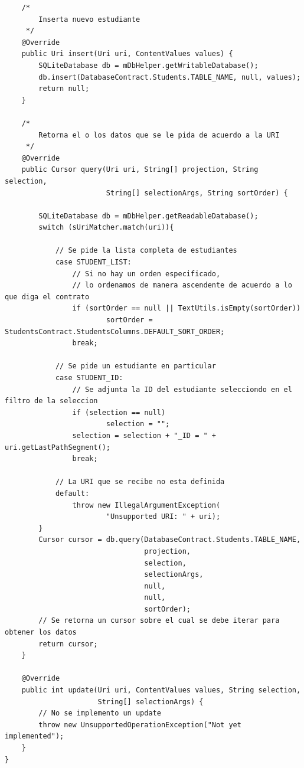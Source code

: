 \documentclass[10pt]{extarticle}
\begin{document}
\begin{lstlisting}
    /*
        Inserta nuevo estudiante
     */
    @Override
    public Uri insert(Uri uri, ContentValues values) {
        SQLiteDatabase db = mDbHelper.getWritableDatabase();
        db.insert(DatabaseContract.Students.TABLE_NAME, null, values);
        return null;
    }

    /*
        Retorna el o los datos que se le pida de acuerdo a la URI
     */
    @Override
    public Cursor query(Uri uri, String[] projection, String selection,
                        String[] selectionArgs, String sortOrder) {

        SQLiteDatabase db = mDbHelper.getReadableDatabase();
        switch (sUriMatcher.match(uri)){
        
            // Se pide la lista completa de estudiantes
            case STUDENT_LIST:
                // Si no hay un orden especificado,
                // lo ordenamos de manera ascendente de acuerdo a lo que diga el contrato
                if (sortOrder == null || TextUtils.isEmpty(sortOrder)) 
                		sortOrder = StudentsContract.StudentsColumns.DEFAULT_SORT_ORDER;
                break;
                
            // Se pide un estudiante en particular
            case STUDENT_ID:
                // Se adjunta la ID del estudiante selecciondo en el filtro de la seleccion
                if (selection == null) 
                		selection = "";
                selection = selection + "_ID = " + uri.getLastPathSegment();
                break;

            // La URI que se recibe no esta definida
            default:
                throw new IllegalArgumentException(
                        "Unsupported URI: " + uri);
        }
        Cursor cursor = db.query(DatabaseContract.Students.TABLE_NAME,
                                 projection,
                                 selection,
                                 selectionArgs,
                                 null,
                                 null,
                                 sortOrder);
        // Se retorna un cursor sobre el cual se debe iterar para obtener los datos
        return cursor;
    }

    @Override
    public int update(Uri uri, ContentValues values, String selection,
                      String[] selectionArgs) {
        // No se implemento un update
        throw new UnsupportedOperationException("Not yet implemented");
    }
}

\end{lstlisting}
\end{document}
